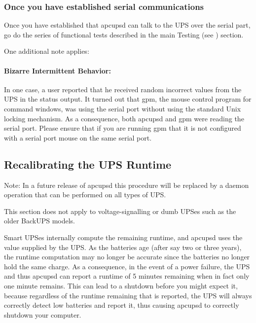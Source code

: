 {{{{{{{{{{\label{Once-you-have-established-serial-communications}

\subsubsection*{Once you have established serial communications}

\label{index-Testing-230}
Once you have established that apcupsd can talk to the UPS over the serial
part, go do the series of functional tests described in the main Testing (see 
) section.  

One additional note applies: 

\label{Bizarre-Intermittent-Behavior}

\paragraph*{Bizarre Intermittent Behavior:}

In one case, a user reported that he received random incorrect values from the
UPS in the status output. It turned out that gpm, the mouse control program
for command windows, was using the serial port without using the standard Unix
locking mechanism. As a consequence, both apcupsd and gpm were reading the
serial port. Please ensure that if you are running gpm that it is not
configured with a serial port mouse on the same serial port. 

\label{Recalibrating-the-UPS-Runtime}

\subsection*{Recalibrating the UPS Runtime}

\label{index-Runtime-recalibration-231}
\label{index-Recalibration-Runtime-232}
Note: In a future release of apcupsd this procedure will be replaced by a
daemon operation that can be performed on all types of UPS.  

This section does not apply to voltage-signalling or dumb UPSes such as the
older BackUPS models.  

Smart UPSes internally compute the remaining runtime, and apcupsd uses the
value supplied by the UPS. As the batteries age (after say two or three
years), the runtime computation may no longer be accurate since the batteries
no longer hold the same charge. As a consequence, in the event of a power
failure, the UPS and thus apcupsd can report a runtime of 5 minutes remaining
when in fact only one minute remains. This can lead to a shutdown before you
might expect it, because regardless of the runtime remaining that is reported,
the UPS will always correctly detect low batteries and report it, thus causing
apcupsd to correctly shutdown your computer.  

}}}}}}}}}}
